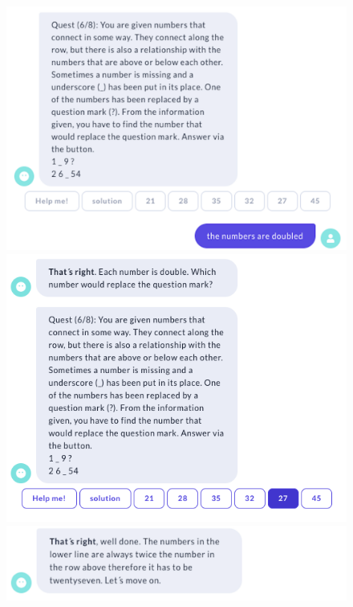 \begin{figure}[H]
  \centering
  \includegraphics[width=0.7\linewidth]{images/VickyQuiz/Q9.1.png}
  \includegraphics[width=0.7\linewidth]{images/VickyQuiz/Q10.png}
  \includegraphics[width=0.7\linewidth]{images/VickyQuiz/Q11.1.png}

  \label{fig:Game_IV}
\end{figure} 
